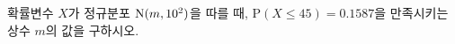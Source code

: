 확률변수 $X$가 정규분포 $\mathrm{N}(m{,}\mkern3mu\mathopen{}10^2)$을 따를 때, $\mathrm{P}(X\le 45)=0.1587$을 만족시키는 상수 $m$의 값을 구하시오. 
